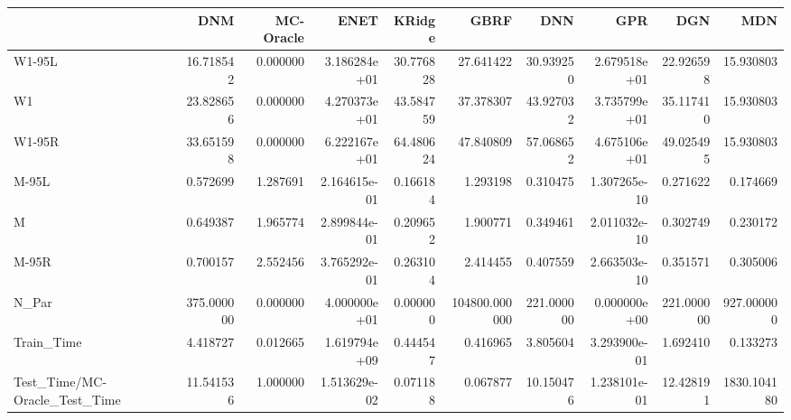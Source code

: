 \begin{tabular}{lrrrrrrrrr}
\toprule
{} &         DNM &  MC-Oracle &          ENET &     KRidge &           GBRF &         DNN &           GPR &         DGN &          MDN \\
\midrule
W1-95L                        &   16.718542 &   0.000000 &  3.186284e+01 &  30.776828 &      27.641422 &   30.939250 &  2.679518e+01 &   22.926598 &    15.930803 \\
W1                            &   23.828656 &   0.000000 &  4.270373e+01 &  43.584759 &      37.378307 &   43.927032 &  3.735799e+01 &   35.117410 &    15.930803 \\
W1-95R                        &   33.651598 &   0.000000 &  6.222167e+01 &  64.480624 &      47.840809 &   57.068652 &  4.675106e+01 &   49.025495 &    15.930803 \\
M-95L                         &    0.572699 &   1.287691 &  2.164615e-01 &   0.166184 &       1.293198 &    0.310475 &  1.307265e-10 &    0.271622 &     0.174669 \\
M                             &    0.649387 &   1.965774 &  2.899844e-01 &   0.209652 &       1.900771 &    0.349461 &  2.011032e-10 &    0.302749 &     0.230172 \\
M-95R                         &    0.700157 &   2.552456 &  3.765292e-01 &   0.263104 &       2.414455 &    0.407559 &  2.663503e-10 &    0.351571 &     0.305006 \\
N\_Par                         &  375.000000 &   0.000000 &  4.000000e+01 &   0.000000 &  104800.000000 &  221.000000 &  0.000000e+00 &  221.000000 &   927.000000 \\
Train\_Time                    &    4.418727 &   0.012665 &  1.619794e+09 &   0.444547 &       0.416965 &    3.805604 &  3.293900e-01 &    1.692410 &     0.133273 \\
Test\_Time/MC-Oracle\_Test\_Time &   11.541536 &   1.000000 &  1.513629e-02 &   0.071188 &       0.067877 &   10.150476 &  1.238101e-01 &   12.428191 &  1830.104180 \\
\bottomrule
\end{tabular}
